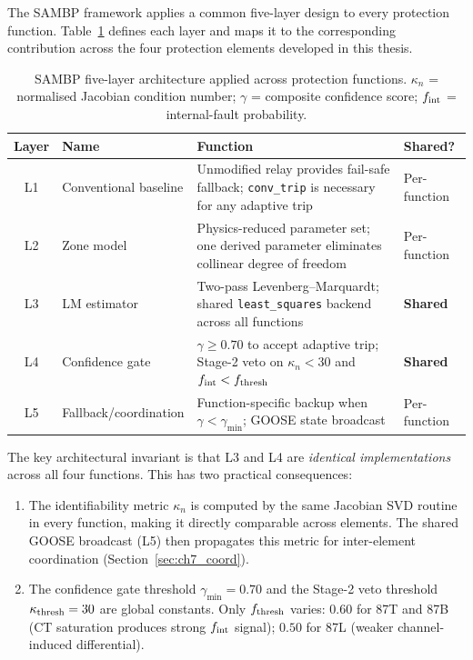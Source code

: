 The SAMBP framework applies a common five-layer design to every protection
function.  Table~\ref{tab:ch7_layers} defines each layer and maps it to
the corresponding contribution across the four protection elements
developed in this thesis.

\begin{table}[ht]
  \centering
  \caption{SAMBP five-layer architecture applied across protection functions.
  $\kappa_n$ = normalised Jacobian condition number; $\gamma$ = composite
  confidence score; $f_{\rm int}$ = internal-fault probability.}
  \label{tab:ch7_layers}
  \small
  \begin{tabular}{clp{5.5cm}l}
    \toprule
    Layer & Name & Function & Shared? \\
    \midrule
    L1 & Conventional baseline & Unmodified relay provides fail-safe fallback;
        \texttt{conv\_trip} is necessary for any adaptive trip & Per-function \\
    L2 & Zone model & Physics-reduced parameter set; one derived parameter
        eliminates collinear degree of freedom & Per-function \\
    L3 & LM estimator & Two-pass Levenberg--Marquardt; shared \texttt{least\_squares}
        backend across all functions & \textbf{Shared} \\
    L4 & Confidence gate & $\gamma \geq 0.70$ to accept adaptive trip;
        Stage-2 veto on $\kappa_n < 30$ and $f_{\rm int} < f_{\rm thresh}$ & \textbf{Shared} \\
    L5 & Fallback/coordination & Function-specific backup when $\gamma <
        \gamma_{\min}$; GOOSE state broadcast & Per-function \\
    \bottomrule
  \end{tabular}
\end{table}

The key architectural invariant is that L3 and L4 are \emph{identical
implementations} across all four functions.  This has two practical
consequences:
\begin{enumerate}
  \item The identifiability metric $\kappa_n$ is computed by the same
    Jacobian SVD routine in every function, making it directly comparable
    across elements.  The shared GOOSE broadcast (L5) then propagates this
    metric for inter-element coordination (Section~\ref{sec:ch7_coord}).
  \item The confidence gate threshold $\gamma_{\min} = 0.70$ and the
    Stage-2 veto threshold $\kappa_{\rm thresh} = 30$ are global constants.
    Only $f_{\rm thresh}$ varies: $0.60$ for 87T and 87B (CT saturation
    produces strong $f_{\rm int}$ signal); $0.50$ for 87L (weaker
    channel-induced differential).
\end{enumerate}

